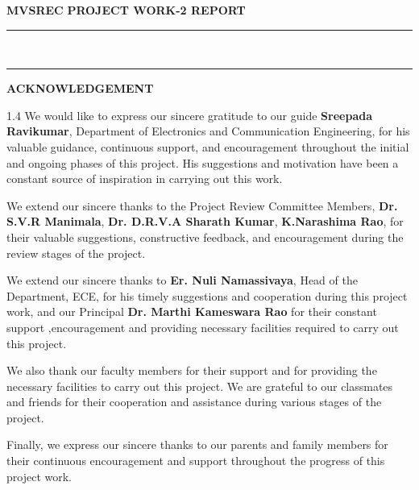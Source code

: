 \documentclass[12pt,a4paper]{article}
\begin{document}
\noindent
{\small\textbf{MVSREC}} \hfill {\small\textbf{PROJECT WORK-2 REPORT}}\\[-0.2cm]
\noindent\rule{\textwidth}{1.8pt}\\[-0.55cm]
\noindent\rule{\textwidth}{0.6pt}

\vspace{1.2cm}

\begin{center}
    {\fontsize{14}{17}\selectfont \textbf{ACKNOWLEDGEMENT}}
\end{center}

\vspace{0.8cm}

\begin{spacing}{1.4}
\noindent
We would like to express our sincere gratitude to our guide \textbf{Sreepada Ravikumar}, Department of Electronics and Communication Engineering, for his valuable guidance, continuous support, and encouragement throughout the initial and ongoing phases of this project. His suggestions and motivation have been a constant source of inspiration in carrying out this work.

\vspace{0.35cm}

\noindent
We extend our sincere thanks to the Project Review Committee Members, \textbf{Dr. S.V.R Manimala}, \textbf{Dr. D.R.V.A Sharath Kumar}, \textbf{K.Narashima Rao}, for their valuable suggestions, constructive feedback, and encouragement during the review stages of the project.

\vspace{0.35cm}

\noindent
We extend our sincere thanks to \textbf{Er. Nuli Namassivaya}, Head of the Department, ECE, for his timely suggestions and cooperation during this project work, and our Principal \textbf{Dr. Marthi Kameswara Rao} for their constant support ,encouragement and providing necessary facilities required to carry out this project.

\vspace{0.35cm}

\noindent
We also thank our faculty members for their support and for providing the necessary facilities to carry out this project. We are grateful to our classmates and friends for their cooperation and assistance during various stages of the project.

\vspace{0.35cm}

\noindent
Finally, we express our sincere thanks to our parents and family members for their continuous encouragement and support throughout the progress of this project work.
\end{spacing}
\end{document}
